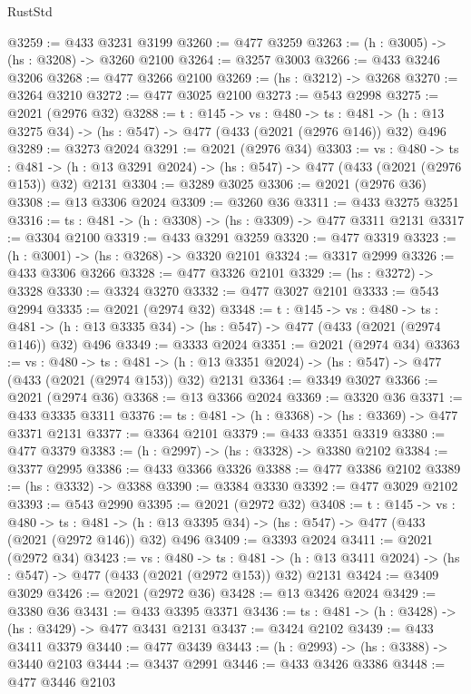 \begin{lexlean}{RustStd}
\begin{coremodule}
{\begin{coremodule}
{{{{{{{{{{{{{{{{@3259 := @433 @3231 @3199
@3260 := @477 @3259
@3263 := (h : @3005) -> (hs : @3208) -> @3260 @2100
@3264 := @3257 @3003
@3266 := @433 @3246 @3206
@3268 := @477 @3266 @2100
@3269 := (hs : @3212) -> @3268
@3270 := @3264 @3210
@3272 := @477 @3025 @2100
@3273 := @543 @2998
@3275 := @2021 (@2976 @32)
@3288 := {t : @145} ->
  {vs : @480} ->
  {ts : @481} -> (h : @13 @3275 @34) -> (hs : @547) -> @477 (@433 (@2021 (@2976 @146)) @32) @496
@3289 := @3273 @2024
@3291 := @2021 (@2976 @34)
@3303 := {vs : @480} ->
  {ts : @481} -> (h : @13 @3291 @2024) -> (hs : @547) -> @477 (@433 (@2021 (@2976 @153)) @32) @2131
@3304 := @3289 @3025
@3306 := @2021 (@2976 @36)
@3308 := @13 @3306 @2024
@3309 := @3260 @36
@3311 := @433 @3275 @3251
@3316 := {ts : @481} -> (h : @3308) -> (hs : @3309) -> @477 @3311 @2131
@3317 := @3304 @2100
@3319 := @433 @3291 @3259
@3320 := @477 @3319
@3323 := (h : @3001) -> (hs : @3268) -> @3320 @2101
@3324 := @3317 @2999
@3326 := @433 @3306 @3266
@3328 := @477 @3326 @2101
@3329 := (hs : @3272) -> @3328
@3330 := @3324 @3270
@3332 := @477 @3027 @2101
@3333 := @543 @2994
@3335 := @2021 (@2974 @32)
@3348 := {t : @145} ->
  {vs : @480} ->
  {ts : @481} -> (h : @13 @3335 @34) -> (hs : @547) -> @477 (@433 (@2021 (@2974 @146)) @32) @496
@3349 := @3333 @2024
@3351 := @2021 (@2974 @34)
@3363 := {vs : @480} ->
  {ts : @481} -> (h : @13 @3351 @2024) -> (hs : @547) -> @477 (@433 (@2021 (@2974 @153)) @32) @2131
@3364 := @3349 @3027
@3366 := @2021 (@2974 @36)
@3368 := @13 @3366 @2024
@3369 := @3320 @36
@3371 := @433 @3335 @3311
@3376 := {ts : @481} -> (h : @3368) -> (hs : @3369) -> @477 @3371 @2131
@3377 := @3364 @2101
@3379 := @433 @3351 @3319
@3380 := @477 @3379
@3383 := (h : @2997) -> (hs : @3328) -> @3380 @2102
@3384 := @3377 @2995
@3386 := @433 @3366 @3326
@3388 := @477 @3386 @2102
@3389 := (hs : @3332) -> @3388
@3390 := @3384 @3330
@3392 := @477 @3029 @2102
@3393 := @543 @2990
@3395 := @2021 (@2972 @32)
@3408 := {t : @145} ->
  {vs : @480} ->
  {ts : @481} -> (h : @13 @3395 @34) -> (hs : @547) -> @477 (@433 (@2021 (@2972 @146)) @32) @496
@3409 := @3393 @2024
@3411 := @2021 (@2972 @34)
@3423 := {vs : @480} ->
  {ts : @481} -> (h : @13 @3411 @2024) -> (hs : @547) -> @477 (@433 (@2021 (@2972 @153)) @32) @2131
@3424 := @3409 @3029
@3426 := @2021 (@2972 @36)
@3428 := @13 @3426 @2024
@3429 := @3380 @36
@3431 := @433 @3395 @3371
@3436 := {ts : @481} -> (h : @3428) -> (hs : @3429) -> @477 @3431 @2131
@3437 := @3424 @2102
@3439 := @433 @3411 @3379
@3440 := @477 @3439
@3443 := (h : @2993) -> (hs : @3388) -> @3440 @2103
@3444 := @3437 @2991
@3446 := @433 @3426 @3386
@3448 := @477 @3446 @2103
}}}}}}}}}}}}}}}}
\end{coremodule}}
\end{coremodule}
\end{lexlean}
